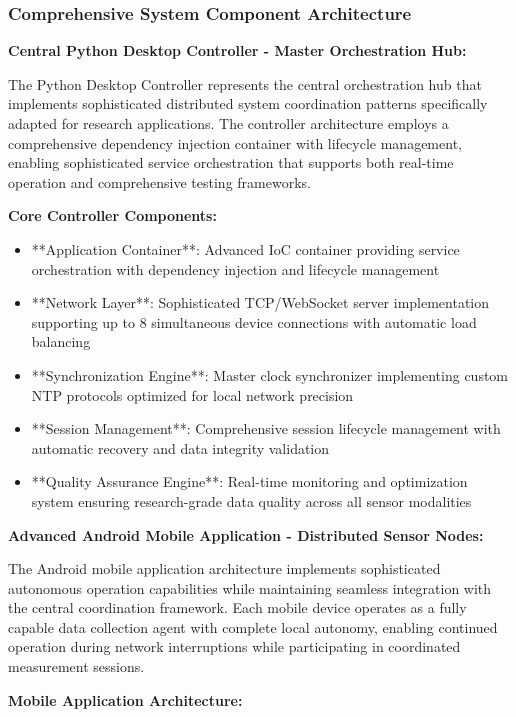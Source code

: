 \documentclass[12pt,a4paper]{report}
\begin{document}
\subsubsection{Comprehensive System Component Architecture}

\textbf{Central Python Desktop Controller - Master Orchestration Hub:}

The Python Desktop Controller represents the central orchestration hub that implements sophisticated distributed system
coordination patterns specifically adapted for research applications. The controller architecture employs a
comprehensive dependency injection container with lifecycle management, enabling sophisticated service orchestration
that supports both real-time operation and comprehensive testing frameworks.

\textbf{Core Controller Components:}

\begin{itemize}
\item **Application Container**: Advanced IoC container providing service orchestration with dependency injection and
  lifecycle management
\item **Network Layer**: Sophisticated TCP/WebSocket server implementation supporting up to 8 simultaneous device
  connections with automatic load balancing
\item **Synchronization Engine**: Master clock synchronizer implementing custom NTP protocols optimized for local network
  precision
\item **Session Management**: Comprehensive session lifecycle management with automatic recovery and data integrity
  validation
\item **Quality Assurance Engine**: Real-time monitoring and optimization system ensuring research-grade data quality across
  all sensor modalities

\end{itemize}
\textbf{Advanced Android Mobile Application - Distributed Sensor Nodes:}

The Android mobile application architecture implements sophisticated autonomous operation capabilities while maintaining
seamless integration with the central coordination framework. Each mobile device operates as a fully capable data
collection agent with complete local autonomy, enabling continued operation during network interruptions while
participating in coordinated measurement sessions.

\textbf{Mobile Application Architecture:}
\end{document}
